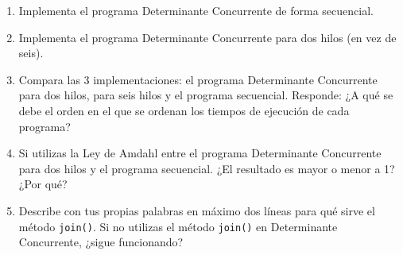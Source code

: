 \documentclass[12pt]{article}
\begin{document}
\begin{enumerate}
    \item Implementa el programa Determinante Concurrente de forma secuencial.
    \item Implementa el programa Determinante Concurrente para dos hilos (en vez de seis).
    \item Compara las 3 implementaciones: el programa Determinante Concurrente para dos hilos, para seis hilos y el programa secuencial. Responde: ¿A qué se debe el orden en el que se ordenan los tiempos de ejecución de cada programa?
    \item Si utilizas la Ley de Amdahl entre el programa Determinante Concurrente para dos hilos y el programa secuencial. ¿El resultado es mayor o menor a 1? ¿Por qué?
    \item Describe con tus propias palabras en máximo dos líneas para qué sirve el método \texttt{join()}. Si no utilizas el método \texttt{join()} en Determinante Concurrente, ¿sigue funcionando?
\end{enumerate}
\end{document}
